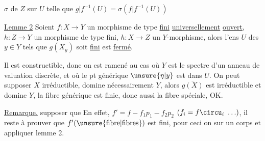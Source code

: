 $\sigma$ de $Z$ sur $U$ telle que $g|f^{-1}(U)=\sigma(f|f^{-1}(U))$

\uline{Lemme 2} Soient $f:X\longrightarrow Y$ un morphisme de type \uline{fini} \uline{universellement} \uline{ouvert},  $h:Z\longrightarrow Y$ un morphisme  de type fini, $h:X\longrightarrow Z$ un $Y$-morphisme, alors l'ens $U$ des $y\in Y$ tels que $g(X_y)$ soit \uline{fini} est  \uline{fermé}.

 Il est  constructible, donc on est ramené au cas où $Y$ est le spectre d'un anneau de valuation discrète, et où le pt générique $\unsure{\eta|y}$ est dans $U$. On peut supposer $X$ irréductible,   domine nécessairement $Y$, alors $\overline{g(X)}$ est irréductible et domine $Y$,  la fibre générique est finie, donc aussi la fibre spéciale, OK.


\uline{Remarque.}     supposer que    En effet,  $f'=f-f_1p_1-f_2p_2$ $(f_i=f\circu_i\ \ldots)$, il reste à prouver que $f'(\text{\unsure{fibre|fibres}})$ est fini, pour ceci on  sur un corps et appliquer lemme 2.
